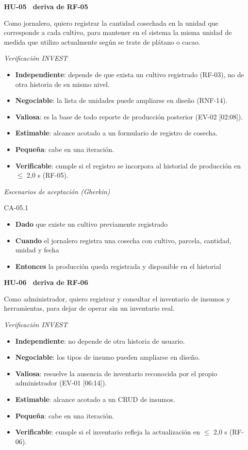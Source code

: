 \documentclass[12pt,a4paper]{article}
\begin{document}
\bigskip
\noindent\textbf{HU-05 \textperiodcentered\ deriva de RF-05}

\smallskip
\noindent Como jornalero, quiero registrar la cantidad cosechada en la unidad que corresponde a cada cultivo, para mantener en el sistema la misma unidad de medida que utilizo actualmente según se trate de plátano o cacao.

\smallskip
\noindent\textit{Verificación INVEST}
\begin{itemize}
\item \textbf{Independiente}: depende de que exista un cultivo registrado (RF-03), no de otra historia de su mismo nivel.
\item \textbf{Negociable}: la lista de unidades puede ampliarse en diseño (RNF-14).
\item \textbf{Valiosa}: es la base de todo reporte de producción posterior (EV-02 [02:08]).
\item \textbf{Estimable}: alcance acotado a un formulario de registro de cosecha.
\item \textbf{Pequeña}: cabe en una iteración.
\item \textbf{Verificable}: cumple si el registro se incorpora al historial de producción en $\leq$ 2,0 s (RF-05).
\end{itemize}

\smallskip
\noindent\textit{Escenarios de aceptación (Gherkin)}

\noindent CA-05.1
\begin{itemize}
\item[] \textbf{Dado} que existe un cultivo previamente registrado
\item[] \textbf{Cuando} el jornalero registra una cosecha con cultivo, parcela, cantidad, unidad y fecha
\item[] \textbf{Entonces} la producción queda registrada y disponible en el historial
\end{itemize}

\bigskip
\noindent\textbf{HU-06 \textperiodcentered\ deriva de RF-06}

\smallskip
\noindent Como administrador, quiero registrar y consultar el inventario de insumos y herramientas, para dejar de operar sin un inventario real.

\smallskip
\noindent\textit{Verificación INVEST}
\begin{itemize}
\item \textbf{Independiente}: no depende de otra historia de usuario.
\item \textbf{Negociable}: los tipos de insumo pueden ampliarse en diseño.
\item \textbf{Valiosa}: resuelve la ausencia de inventario reconocida por el propio administrador (EV-01 [06:14]).
\item \textbf{Estimable}: alcance acotado a un CRUD de insumos.
\item \textbf{Pequeña}: cabe en una iteración.
\item \textbf{Verificable}: cumple si el inventario refleja la actualización en $\leq$ 2,0 s (RF-06).
\end{itemize}
\end{document}
